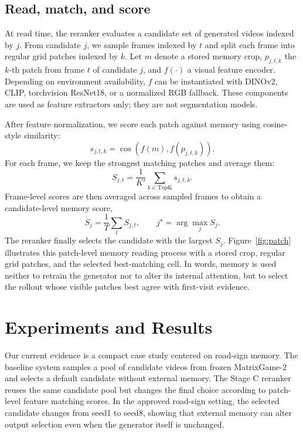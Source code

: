 \documentclass[10pt,twocolumn,letterpaper]{article}
\begin{document}
\subsection{Read, match, and score}
At read time, the reranker evaluates a candidate set of generated videos indexed by $j$. From candidate $j$, we sample frames indexed by $t$ and split each frame into regular grid patches indexed by $k$. Let $m$ denote a stored memory crop, $p_{j,t,k}$ the $k$-th patch from frame $t$ of candidate $j$, and $f(\cdot)$ a visual feature encoder. Depending on environment availability, $f$ can be instantiated with DINOv2, CLIP, torchvision ResNet18, or a normalized RGB fallback. These components are used as feature extractors only; they are not segmentation models.

After feature normalization, we score each patch against memory using cosine-style similarity:
\begin{equation}
 s_{j,t,k} = \cos\left(f(m), f\left(p_{j,t,k}\right)\right).
\end{equation}
For each frame, we keep the strongest matching patches and average them:
\begin{equation}
 S_{j,t} = \frac{1}{K'} \sum_{k \in \mathrm{TopK}} s_{j,t,k}.
\end{equation}
Frame-level scores are then averaged across sampled frames to obtain a candidate-level memory score,
\begin{equation}
 S_j = \frac{1}{T}\sum_t S_{j,t}, \qquad j^{\star} = \arg\max_j S_j.
\end{equation}
The reranker finally selects the candidate with the largest $S_j$. Figure~\ref{fig:patch} illustrates this patch-level memory reading process with a stored crop, regular grid patches, and the selected best-matching cell. In words, memory is used neither to retrain the generator nor to alter its internal attention, but to select the rollout whose visible patches best agree with first-visit evidence.

\section{Experiments and Results}
Our current evidence is a compact case study centered on road-sign memory. The baseline system samples a pool of candidate videos from frozen MatrixGame-2 and selects a default candidate without external memory. The Stage C reranker reuses the same candidate pool but changes the final choice according to patch-level feature matching scores. In the approved road-sign setting, the selected candidate changes from seed1 to seed8, showing that external memory can alter output selection even when the generator itself is unchanged.
\end{document}

